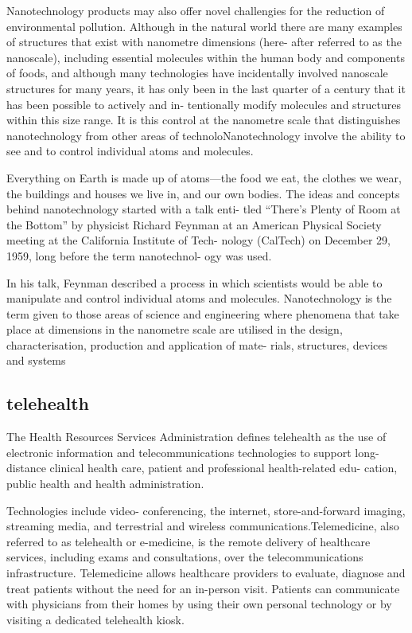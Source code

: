 \documentclass{article}
\begin{document}
Nanotechnology products may also offer novel challengies for the reduction
of environmental pollution.
Although in the natural world there
are many examples of structures that exist with nanometre dimensions (here-
after referred to as the nanoscale), including essential molecules within the
human body and components of foods, and although many technologies have
incidentally involved nanoscale structures for many years, it has only been
in the last quarter of a century that it has been possible to actively and in-
tentionally modify molecules and structures within this size range. It is this
control at the nanometre scale that distinguishes nanotechnology from other
areas of technoloNanotechnology involve the ability to see and to control individual atoms
and molecules. 





Everything on Earth is made up of atoms—the food we eat,
the clothes we wear, the buildings and houses we live in, and our own bodies.
The ideas and concepts behind nanotechnology started with a talk enti-
tled “There’s Plenty of Room at the Bottom” by physicist Richard Feynman
at an American Physical Society meeting at the California Institute of Tech-
nology (CalTech) on December 29, 1959, long before the term nanotechnol-
ogy was used. 


In his talk, Feynman described a process in which scientists
would be able to manipulate and control individual atoms and molecules.
Nanotechnology is the term given to those areas of science and engineering
where phenomena that take place at dimensions in the nanometre scale are
utilised in the design, characterisation, production and application of mate-
rials, structures, devices and systems

\subsection{telehealth}

The Health Resources Services Administration defines telehealth as the
use of electronic information and telecommunications technologies to support
long-distance clinical health care, patient and professional health-related edu-
cation, public health and health administration.




 Technologies include video-
conferencing, the internet, store-and-forward imaging, streaming media, and
terrestrial and wireless communications.Telemedicine, also referred to as telehealth or e-medicine, is the remote
delivery of healthcare services, including exams and consultations, over the
telecommunications infrastructure. Telemedicine allows healthcare providers
to evaluate, diagnose and treat patients without the need for an in-person
visit. Patients can communicate with physicians from their homes by using
their own personal technology or by visiting a dedicated telehealth kiosk.
\end{document}
